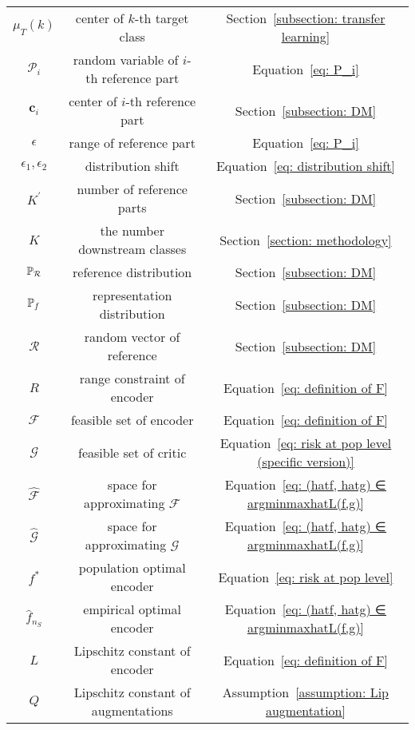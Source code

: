 \begin{longtable}{@{}ccc@{}}
    $\mu_T(k)$ & center of $k$-th target class &  Section~\ref{subsection: transfer learning}        \\
    $\mathcal{P}_i$ & random variable of $i$-th reference part &  Equation~\eqref{eq: P_i}  \\
    $\bm{c}_i$      & center of $i$-th reference part &   Section~\ref{subsection: DM} \\
    $\epsilon$      & range of reference part   &  Equation~\eqref{eq: P_i} \\
    $\epsilon_1, \epsilon_2$  & distribution shift &   Equation~\eqref{eq: distribution shift} \\
    $K^\prime$      & number of reference parts    &   Section~\ref{subsection: DM}       \\
    $K$             & the number downstream classes  &    Section~\ref{section: methodology}   \\
    $\P_\mathcal{R}$  & reference distribution     &   Section~\ref{subsection: DM}       \\
    $\P_f$           & representation distribution &    Section~\ref{subsection: DM}      \\
    $\mathcal{R}$   &  random vector of reference   &    Section~\ref{subsection: DM}      \\
    $R$             & range constraint of encoder  &   Equation~\eqref{eq: definition of F} \\
    $\mathcal{F}$   & feasible set of encoder     &   Equation~\eqref{eq: definition of F}       \\
    $\mathcal{G}$   & feasible set of critic &  Equation~\eqref{eq: risk at pop level (specific version)}      \\
    $\widehat{\mathcal{F}}$ & space for approximating $\mathcal{F}$ &  Equation~\eqref{eq: (hatf, hatg) ∈ argminmaxhatL(f,g)}        \\
    $\widehat{\mathcal{G}}$ & space for approximating $\mathcal{G}$ &  Equation~\eqref{eq: (hatf, hatg) ∈ argminmaxhatL(f,g)}        \\
    $f^*$           & population optimal encoder  &  Equation~\eqref{eq: risk at pop level}       \\
    $\hat{f}_{n_S}$ & empirical optimal encoder  &   Equation~\eqref{eq: (hatf, hatg) ∈ argminmaxhatL(f,g)}      \\
    $L$             & Lipschitz constant of encoder &  Equation~\eqref{eq: definition of F}  \\
    $Q$             & Lipschitz constant of augmentations &  Assumption~\ref{assumption: Lip augmentation} \\

\end{longtable}

